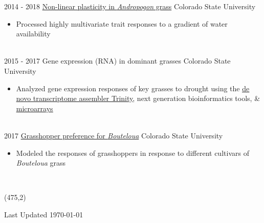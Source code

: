 \documentclass[letterpaper]{twentysecondcv} %
\begin{document}
\begin{twenty}
	\twentyitem
    	{2014 -}
		{2018}
        {\href{https://github.com/avahoffman/nonlinear-plasticity}{Non-linear plasticity in \textit{Andropogon} grass}}
        {Colorado State University}
        {}
        {
        {\begin{itemize}
        \item Processed highly multivariate trait responses to a gradient of water availability
    \end{itemize}}
        }
    \\   
    	\twentyitem
    	{2015 -}
		{2017}
        {Gene expression (RNA) in dominant grasses}
        {Colorado State University}
        {}
        {
        {\begin{itemize}
        \item Analyzed gene expression responses of key grasses to drought using the \href{https://github.com/avahoffman/gene-expression}{\underline{de novo transcriptome assembler Trinity}}, next generation bioinformatics tools, \& \href{https://github.com/avahoffman/climate-extremes-gene-expression}{\underline{microarrays}}
    \end{itemize}}
        }
    \\   
        	\twentyitem
    	{2017}
		{}
        {\href{https://github.com/avahoffman/grasshopper-preference}{Grasshopper preference for \textit{Bouteloua}}}
        {Colorado State University}
        {}
        {
        {\begin{itemize}
        \item Modeled the responses of grasshoppers in response to different cultivars of \textit{Bouteloua} grass
    \end{itemize}}
        }
    \\   

\end{twenty}

\begin{textblock*}{4cm}(475,2) %
\color{mainblue}\fontsize{8pt}{10pt}\selectfont %
\begin{flushright}
Last Updated \today %
\end{flushright}
\end{textblock*}
\end{document}
